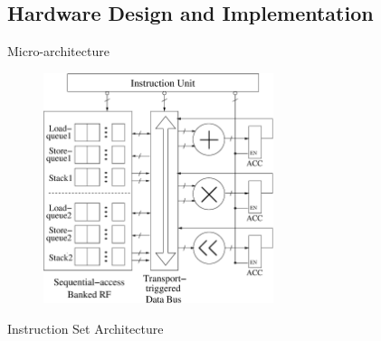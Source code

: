 \documentclass{beamer}
\begin{document}
\begin{CJK}{UTF8}{bkai}
    \subsection{Hardware Design and Implementation}
    \begin{frame}{Micro-architecture}
        \begin{figure}[!ht] 
            \centering
            \includegraphics[width=0.6\textwidth]{./figs/micro.eps}
            \label{fig:micro}
        \end{figure}
    \end{frame}

    \begin{frame}{Instruction Set Architecture}
        
    \end{frame}
 

\end{CJK}
\end{document}
